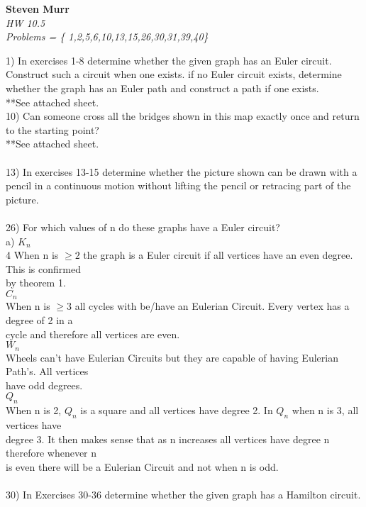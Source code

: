 \documentclass{article}
\begin{document}
\setcounter{totalnumber}{5}
   \begin{flushright}
      \Large\textbf{Steven Murr}\\
      \large\textit{HW 10.5} \\
      \large\textit{ Problems = \{ 1,2,5,6,10,13,15,26,30,31,39,40\} }
   \end{flushright}
\begin{flushleft}
\makeatletter%
\setlength{\@fptop}{5pt}
\makeatother
\setlength\parindent{0pt}1) In exercises 1-8 determine whether the given graph has an Euler circuit.  Construct such a circuit when one exists.  if no Euler circuit exists, determine whether the graph has an Euler path and construct a path if one exists. \\
**See attached sheet.
~\\
\setlength\parindent{0pt}10) Can someone cross all the bridges shown in this map exactly once and return to the starting point? \\ 
**See attached sheet. \\
~\\
\setlength\parindent{0pt}13) In exercises 13-15 determine whether the picture shown can be drawn with a pencil in a continuous motion without lifting the pencil or retracing part of the picture. \\
~\\
\setlength\parindent{0pt}26) For which values of n do these graphs have a Euler circuit? \\
\setlength\parindent{24pt}a) $K_n$ \\4
\setlength\parindent{48pt} When n is $\geq 2$ the graph is a Euler circuit if all vertices have an even degree.  This is confirmed \\by theorem 1.\\ 
\setlength\parindent{24pt}$C_n$ \\
\setlength\parindent{48pt} When n is $\geq 3$ all cycles with be/have an Eulerian Circuit.  Every vertex has a degree of 2 in a \\cycle and therefore all vertices are even.   \\
\setlength\parindent{24pt}$W_n$ \\
\setlength\parindent{48pt} Wheels can't have Eulerian Circuits but they are capable of having Eulerian Path's.  All vertices \\have odd degrees.\\
\setlength\parindent{24pt} $Q_n$ \\
\setlength\parindent{48pt} When n is  2, $Q_n$ is a square and all vertices have degree 2.  In $Q_n$ when n is 3, all vertices have \\degree 3.  It then makes sense that as n increases all vertices have degree n therefore whenever n \\is even there will be a Eulerian Circuit and not when n is odd. \\
~\\
\setlength\parindent{0pt}30) In Exercises 30-36 determine whether the given graph has a Hamilton circuit. \\


\end{flushleft}
\end{document}
